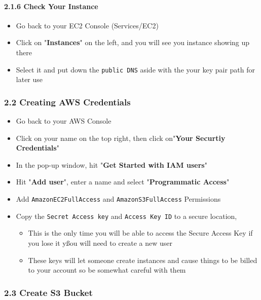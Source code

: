 \documentclass[]{article}
\let\oldparagraph\paragraph
\renewcommand{\paragraph}[1]{\oldparagraph{#1}\mbox{}}
\begin{document}
\hypertarget{header-n202}{%
\paragraph{2.1.6 Check Your Instance}\label{header-n202}}

\begin{itemize}
\item
  Go back to your EC2 Console (Services/EC2)
\item
  Click on "\textbf{Instances}" on the left, and you will see you
  instance showing up there
\item
  Select it and put down the \texttt{public\ DNS} aside with the your
  key pair path for later use
\end{itemize}

\hypertarget{header-n215}{%
\subsubsection{2.2 Creating AWS Credentials}\label{header-n215}}

\begin{itemize}
\item
  Go back to your AWS Console
\item
  Click on your name on the top right, then click on"\textbf{Your
  Securtiy Credentials}"
\item
  In the pop-up window, hit "\textbf{Get Started with IAM users}"
\item
  Hit "\textbf{Add user}", enter a name and select "\textbf{Programmatic
  Access}"
\item
  Add \texttt{AmazonEC2FullAccess} and \texttt{AmazonS3FullAccess}
  Permissions
\item
  Copy the \texttt{Secret\ Access\ key} and \texttt{Access\ Key\ ID} to
  a secure location,

  \begin{itemize}
  \item
    This is the only time you will be able to access the Secure Access
    Key if you lose it yßou will need to create a new user
  \item
    These keys will let someone create instances and cause things to be
    billed to your account so be somewhat careful with them
  \end{itemize}
\end{itemize}

\hypertarget{header-n244}{%
\subsubsection{2.3 Create S3 Bucket}\label{header-n244}}
\end{document}
